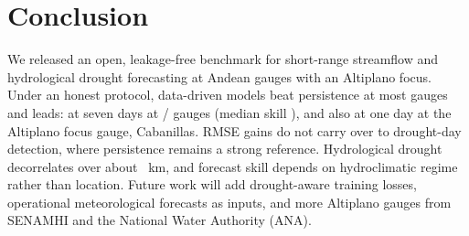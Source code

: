 \section{Conclusion}
\label{sec:conclusion}

We released an open, leakage-free benchmark for short-range streamflow and hydrological drought forecasting at \nGauges{} Andean gauges with an Altiplano focus. Under an honest protocol, data-driven models beat persistence at most gauges and leads: at seven days at \nPosSeven{}/\nGauges{} gauges (median skill \medSkillSeven{}), and also at one day at the Altiplano focus gauge, Cabanillas. RMSE gains do not carry over to drought-day detection, where persistence remains a strong reference. Hydrological drought decorrelates over about \corrDzero~km, and forecast skill depends on hydroclimatic regime rather than location. Future work will add drought-aware training losses, operational meteorological forecasts as inputs, and more Altiplano gauges from SENAMHI and the National Water Authority (ANA).
